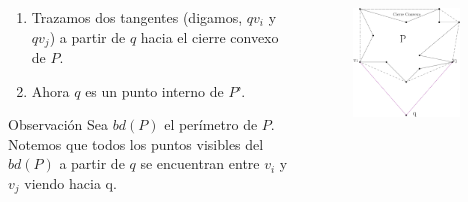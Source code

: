 \documentclass[aspectratio=169,xcolor=dvipsnames, t]{beamer}
\begin{document}
\begin{frame}{}
    \begin{columns}
    \begin{column}{0.45\textwidth}
        \begin{enumerate}
            \item Trazamos dos tangentes (digamos, $qv_{i}$ y $qv_{j}$) a partir de $q$ hacia el cierre convexo de $P$. 
            \item Ahora $q$ es un punto interno de $P’$.\\
        \end{enumerate}
    \begin{block}{Observación}
    \small
        Sea $bd(P)$ el perímetro de $P$. Notemos que todos los puntos visibles del $bd(P)$ a partir de $q$ se encuentran entre $v_{i}$ y $v_{j}$ viendo hacia q.
    \end{block}
    \end{column}
    \begin{column}{0.45\textwidth}  %
        \begin{figure}
            \centering
            \includegraphics[width=0.9\textwidth]{imagenes/Caso01.png}
        \end{figure}
    \end{column}
    \end{columns}
\end{frame}
\end{document}
